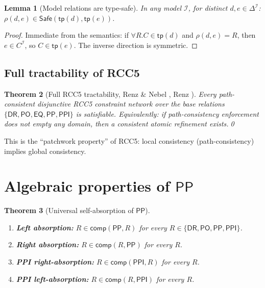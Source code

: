 \documentclass[a4paper,11pt]{article}
\newtheorem{theorem}{Theorem}[section]
\newtheorem{lemma}[theorem]{Lemma}
\theoremstyle{definition}
\newcommand{\DR}{\ensuremath{\mathsf{DR}}}
\newcommand{\PO}{\ensuremath{\mathsf{PO}}}
\newcommand{\EQ}{\ensuremath{\mathsf{EQ}}}
\newcommand{\PP}{\ensuremath{\mathsf{PP}}}
\newcommand{\PPI}{\ensuremath{\mathsf{PPI}}}
\newcommand{\comp}{\ensuremath{\mathsf{comp}}}
\newcommand{\tp}{\ensuremath{\mathsf{tp}}}
\newcommand{\Safe}{\ensuremath{\mathsf{Safe}}}
\newcommand{\interp}{\ensuremath{\mathcal{I}}}
\newcommand{\DeltaI}{\ensuremath{\Delta^{\mathcal{I}}}}
\begin{document}
\begin{lemma}[Model relations are type-safe]\label{lem:model-safe}
In any model $\interp$, for distinct $d, e \in \DeltaI$:
$\rho(d, e) \in \Safe(\tp(d), \tp(e))$.
\end{lemma}

\begin{proof}
Immediate from the semantics: if $\forall R.C \in \tp(d)$ and
$\rho(d, e) = R$, then $e \in C^{\interp}$, so $C \in \tp(e)$.
The inverse direction is symmetric.
\end{proof}

\subsection{Full tractability of RCC5}

\begin{theorem}[Full RCC5 tractability, Renz \& Nebel
, Renz
]\label{thm:full-tractability}
Every path-consistent disjunctive RCC5 constraint network over the
base relations $\{\DR, \PO, \EQ, \PP, \PPI\}$ is satisfiable.
Equivalently: if path-consistency enforcement does not empty any
domain, then a consistent atomic refinement exists.\qed
\end{theorem}

This is the ``patchwork property'' of RCC5: local consistency
(path-consistency) implies global consistency.


\section{Algebraic properties of $\PP$}\label{sec:pp-algebra}

\begin{theorem}[Universal self-absorption of $\PP$]
\label{thm:self-absorbing}
\begin{enumerate}[label=(\alph*)]
\item \textbf{Left absorption:} $R \in \comp(\PP, R)$ for every
  $R \in \{\DR,\PO,\PP,\PPI\}$.
\item \textbf{Right absorption:} $R \in \comp(R, \PP)$ for every $R$.
\item \textbf{PPI right-absorption:} $R \in \comp(\PPI, R)$ for every $R$.
\item \textbf{PPI left-absorption:} $R \in \comp(R, \PPI)$ for every $R$.
\end{enumerate}
\end{theorem}
\end{document}
